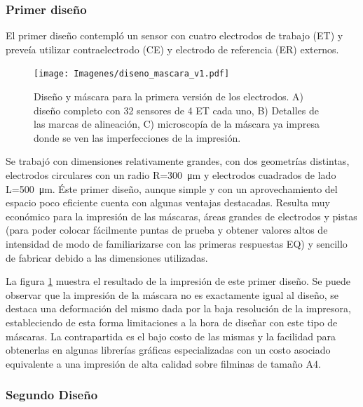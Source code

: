 		 \subsubsection{Primer diseño}

		     El primer diseño contempló un sensor con cuatro electrodos de trabajo (ET) y preveía utilizar contraelectrodo (CE) y electrodo de referencia (ER) externos. 

		    	\begin{figure}[th!]
		 	       	\texttt{[image: Imagenes/diseno\_mascara\_v1.pdf]}
 		       		\caption[Primer diseño y máscara de los sensores]{Diseño y máscara para la primera versión de los electrodos. A) diseño completo con 32 sensores de 4 ET cada uno, B) Detalles de las marcas de alineación, C) microscopía de la máscara ya impresa donde se ven las imperfecciones de la impresión.}
 		         	\label{fig:diseno_mascara_v1}
 		     		\end{figure}
 		 	 \pagebreak
 		     		
		      Se trabajó con dimensiones relativamente grandes, con dos geometrías distintas, electrodos circulares con un radio R=\SI{300}{\um} y electrodos cuadrados de lado L=\SI{500}{\um}. Éste primer diseño, aunque simple y con un aprovechamiento del espacio poco eficiente cuenta con algunas ventajas destacadas. Resulta muy económico para la impresión de las máscaras, áreas grandes de electrodos y pistas (para poder colocar fácilmente puntas de prueba y obtener valores altos de intensidad de modo de familiarizarse con las primeras respuestas EQ) y sencillo de fabricar debido a las dimensiones utilizadas.
		
		      La figura \ref{fig:diseno_mascara_v1} muestra el resultado de la impresión de este primer diseño. Se puede observar que la impresión de la máscara no es exactamente igual al diseño, se destaca una deformación del mismo dada por la baja resolución de la impresora, estableciendo de esta forma limitaciones a la hora de diseñar con este tipo de máscaras. La contrapartida es el bajo costo de las mismas y la facilidad para obtenerlas en algunas librerías gráficas especializadas con un costo asociado equivalente a una impresión de alta calidad sobre filminas de tamaño A4.
		
 		 \subsubsection{Segundo Diseño}

